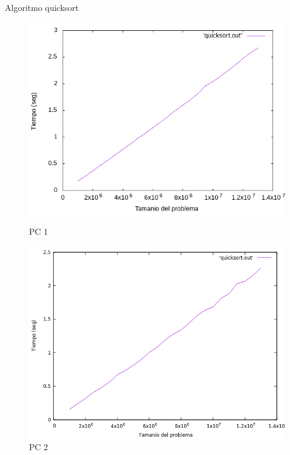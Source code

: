 \documentclass{beamer}
\begin{document}
\begin{frame}[fragile]{Algoritmo quicksort}
\begin{figure}[H]
\centering
\begin{minipage}{.5\textwidth}
  \centering
  \includegraphics[width=\linewidth]{empirica_quicksort.png}
   \caption*{PC 1}
\end{minipage}%
\begin{minipage}{.5\textwidth}
  \centering
  \includegraphics[width=\linewidth]{empirica_quicksort_2.png}
  \caption*{PC 2}
\end{minipage}
\end{figure}
\end{frame}
\end{document}
